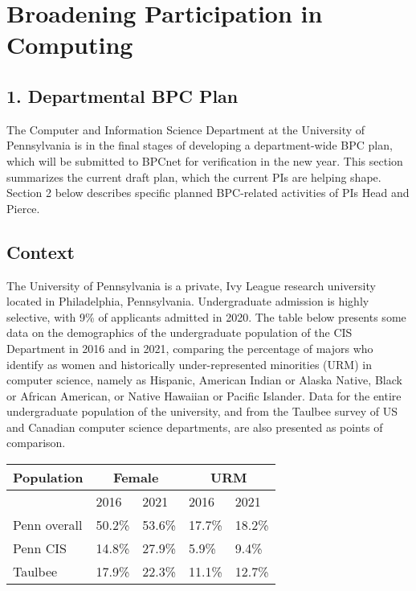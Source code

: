 
\section*{Broadening Participation in Computing}

\subsection*{1. Departmental BPC Plan}

The Computer and Information Science Department at the University of
Pennsylvania is in the final stages of developing a department-wide
BPC plan, which will be submitted to BPCnet for verification in the
new year.  This section summarizes the current draft plan, which the
current PIs are helping shape.  Section 2 below describes specific
planned BPC-related activities of PIs Head and Pierce.

\subsection*{Context}

The University of Pennsylvania is a private, Ivy League research university located in Philadelphia, Pennsylvania. Undergraduate admission is highly selective, with 9\% of applicants admitted in 2020. The table below presents some data on the demographics of the undergraduate population of the CIS Department in 2016 and in 2021, comparing the percentage of majors who identify as women and historically under-represented minorities (URM) in computer science, namely as Hispanic, American Indian or Alaska Native, Black or African American, or Native Hawaiian or Pacific Islander. Data for the entire undergraduate population of the university, and from the Taulbee survey of US and Canadian computer science departments, are also presented as points of comparison.

\begin{center}
\begin{tabular}{|l|l|l|l|l|}
\hline
  Population & \multicolumn{2}{|c|}{Female} & \multicolumn{2}{|c|}{URM}
\\
\hline
  & 2016 & 2021 & 2016 & 2021
\\
\hline
Penn overall &
50.2\% &
53.6\% &
17.7\% &
18.2\%
\\
Penn CIS &
14.8\% &
27.9\% &
5.9\% &
9.4\%
\\
Taulbee &
17.9\% &
22.3\% &
11.1\% &
12.7\% \\
\hline
\end{tabular}
\end{center}

